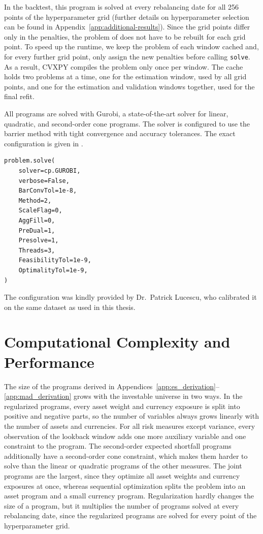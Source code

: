 In the backtest, this program is solved at every rebalancing date for all 256 points of the hyperparameter grid (further details on hyperparameter 
selection can be found in 
Appendix~\ref{app:additional-results}). Since the grid points differ only in the penalties,
the problem of  does not have to be rebuilt for
each grid point. To speed up the runtime, we keep the problem of each window cached and, for every further grid
point, only assign the new penalties before calling \texttt{solve}. As a result, CVXPY compiles the problem only once
per window.
The cache holds two problems at a time, one for the estimation window, used by all grid points, and one for the
estimation and validation windows together, used for the final refit.

All programs are solved with Gurobi, a state-of-the-art solver for linear, quadratic, and second-order cone programs. 
The solver is configured to use the barrier method with tight convergence and
accuracy tolerances. The exact configuration is given in .

\begin{lstlisting}[style=python, caption={Configuration of Gurobi for all programs.}, label={lst:gurobi-config}]
problem.solve(
    solver=cp.GUROBI,
    verbose=False,
    BarConvTol=1e-8,
    Method=2,
    ScaleFlag=0,
    AggFill=0,
    PreDual=1,
    Presolve=1,
    Threads=3,
    FeasibilityTol=1e-9,
    OptimalityTol=1e-9,
)
\end{lstlisting}

The configuration was kindly provided by Dr.\ Patrick Lucescu, who calibrated it on the same dataset as used in this thesis. 

\section{Computational Complexity and Performance}\label{sec:computational-complexity}

The size of the programs derived in Appendices~\ref{app:es_derivation}--\ref{app:mad_derivation} grows with the
investable universe in two ways. In the regularized programs, every asset weight and currency exposure is split 
into positive and negative parts, so the number of variables always grows linearly with the number of assets and
currencies. For all risk measures except variance, every observation of the lookback window adds one more auxiliary
variable and one constraint to the program. The second-order expected shortfall programs additionally 
have a second-order cone constraint, which makes them harder to solve than the linear or quadratic programs of the other measures.
The joint programs are the largest, since they optimize all asset weights and currency exposures at once, whereas
sequential optimization splits the problem into an asset program and a small currency program. 
Regularization hardly changes the size of a program, but it multiplies the number of programs solved
at every rebalancing date, since the regularized programs are solved for every point of the hyperparameter grid.

